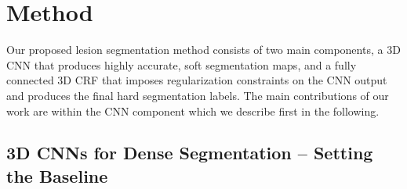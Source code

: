 
\section{Method}
\label{sec:segmentationSystem}

Our proposed lesion segmentation method consists of two main components, a 3D CNN that produces highly accurate, soft segmentation maps, and a fully connected 3D CRF that imposes regularization constraints on the CNN output and produces the final hard segmentation labels. The main contributions of our work are within the CNN component which we describe first in the following.

\subsection{3D CNNs for Dense Segmentation -- Setting the Baseline}
\label{subsec:theBaseline}

